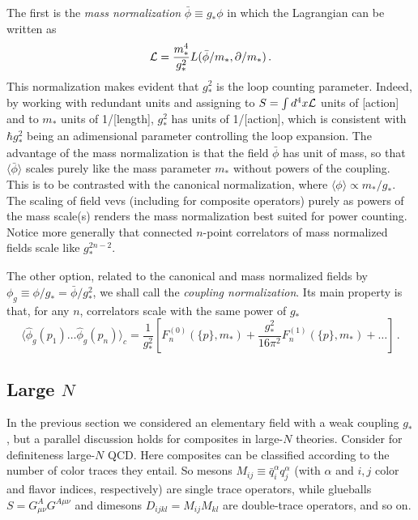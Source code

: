 \documentclass[a4paper,12pt]{article}
\newcommand{\beq}{\begin{equation}}
\newcommand{\eeq}{\end{equation}}
\def\mst{m_*}
\begin{document}
The first is the {\it{mass normalization}} $\bar \phi\equiv g_* \phi $ in which the Lagrangian can be written as
\beq
{\cal L}=\frac{\mst^4}{g_*^2} L(\bar \phi/\mst,\partial/\mst)\,.
\eeq
This normalization makes evident that $g_*^2$ is the loop counting  parameter. Indeed, by working with redundant units and assigning to $S=\int d^4x {\cal L}$ units of [action] and to $\mst$ units of 1/[length], $g_*^2$ has units of 1/[action], which is consistent with $ \hbar g_*^2$ being an adimensional parameter controlling the loop expansion. The advantage of the mass normalization is that the field $\bar \phi$ has unit of mass, so that $\langle \bar \phi\rangle$  scales purely like the mass parameter $\mst$ without powers of the coupling. This is to be contrasted with the canonical normalization, where $\langle \phi\rangle\propto \mst/g_*$.  The scaling  of field vevs (including for composite operators) purely as powers of the mass scale(s) renders the mass normalization best suited for power counting. Notice  more generally that connected $n$-point  correlators of mass normalized fields scale like $g_*^{2n-2}$.

The other option, related to the canonical and mass normalized fields by $\phi_g\equiv \phi/g_*=\bar \phi/g_*^2$, we shall call the {\it{coupling normalization}}. Its main property is that, for any $n$, correlators scale with the same power of $g_*$
\beq
\langle \hat\phi_g(p_1)\dots\hat \phi_g(p_n)\rangle_c= \frac{1}{g_*^2}\left [F_n^{(0)}(\{p\},\mst)+\frac{g_*^2}{16\pi^2}F_n^{(1)}(\{p\},\mst)+\dots\right ]\,.
\label{couplingNorm}
\eeq

\boldmath
\subsection{Large $N$}
\unboldmath
\label{sec:Large N}
In the previous section we considered an elementary field with a weak coupling $g_*$, but a parallel discussion holds for composites in large-$N$ theories. Consider for definiteness large-$N$ QCD. Here composites can be classified according to the number of color traces they entail. So mesons $M_{ij}\equiv {\bar q}_i^\alpha q_j^\alpha$ (with $\alpha$ and $i,j$  color and flavor indices, respectively) are single trace operators, while glueballs $S=G_{\mu\nu}^AG^{A\mu\nu}$ and dimesons $D_{ijkl}=M_{ij}M_{kl}$ are double-trace operators, and so on.
\end{document}
